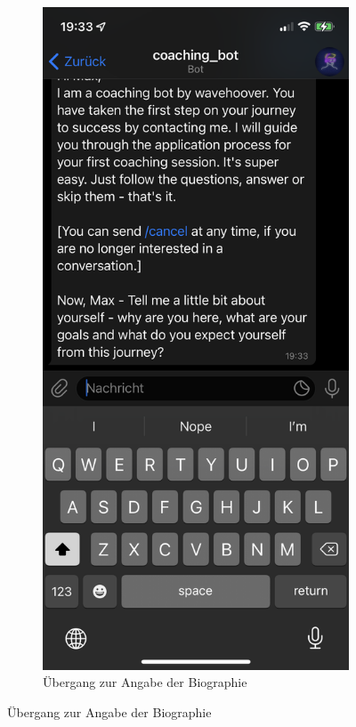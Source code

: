 	\begin{figure}

		\hfill
		
		\begin{subfigure}{0.3\textwidth}
			\includegraphics[width=\textwidth]{images/Screenshots/bio.PNG}
			\caption{Übergang zur Angabe der Biographie}
			\label{fig: scs..bio}
		\end{subfigure}


\end{figure}
